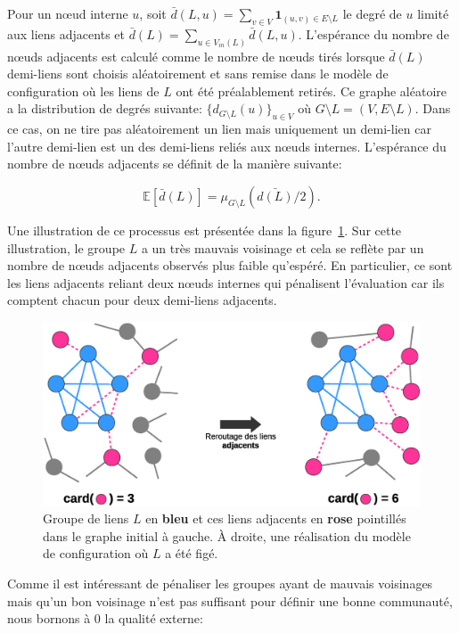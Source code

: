 Pour un n\oe{}ud interne $u$, soit $\bar{d}(L,u) = \sum_{v \in V} \mathbf{1}_{(u,v) \in E \setminus L}$ le degré de $u$ limité aux liens adjacents et $\bar{d}(L)=\sum_{u \in V_{in}(L)} \bar{d}(L,u)$.
L'espérance du nombre de n\oe{}uds adjacents est calculé comme le nombre de n\oe{}uds tirés lorsque $\bar{d}(L)$ demi-liens sont choisis aléatoirement et sans remise dans le modèle de configuration où les liens de $L$ ont été préalablement retirés.
Ce graphe aléatoire a la distribution de degrés suivante: $\{d_{G \setminus L }(u)\}_{u \in V}$ où $G \setminus L = (V,E\setminus L)$.
Dans ce cas, on ne tire pas aléatoirement un lien mais uniquement un demi-lien car l'autre demi-lien est un des demi-liens reliés aux n\oe{}uds internes.
L'espérance du nombre de n\oe{}uds adjacents se définit de la manière suivante:

\begin{equation}
	\mathbb{E}[\bar{d}(L)] = \mu_{G\setminus L}(\bar{d(L)}/2).
\end{equation}

Une illustration de ce processus est présentée dans la figure~\ref{fig:retourt_ext}.
Sur cette illustration, le groupe $L$ a un très mauvais voisinage et cela se reflète par un nombre de n\oe{}uds adjacents observés plus faible qu'espéré.
En particulier, ce sont les liens adjacents reliant deux n\oe{}uds internes qui pénalisent l'évaluation car ils comptent chacun pour deux demi-liens adjacents.

\begin{figure}
\centering
\includegraphics[width=0.7\linewidth]{img/ExpectedNodes/reroutageExt3}
\caption{Groupe de liens $L$ en \textcolor{semilightblue}{\textbf{bleu}} et ces liens adjacents en \textcolor{pinkyred}{\textbf{rose}} pointillés dans le graphe initial à gauche.
\`A droite, une réalisation du modèle de configuration où $L$ a été figé.}
\label{fig:retourt_ext}
\end{figure}

Comme il est intéressant de pénaliser les groupes ayant de mauvais voisinages mais qu'un bon voisinage n'est pas suffisant pour définir une bonne communauté, nous bornons à $0$ la qualité externe:

